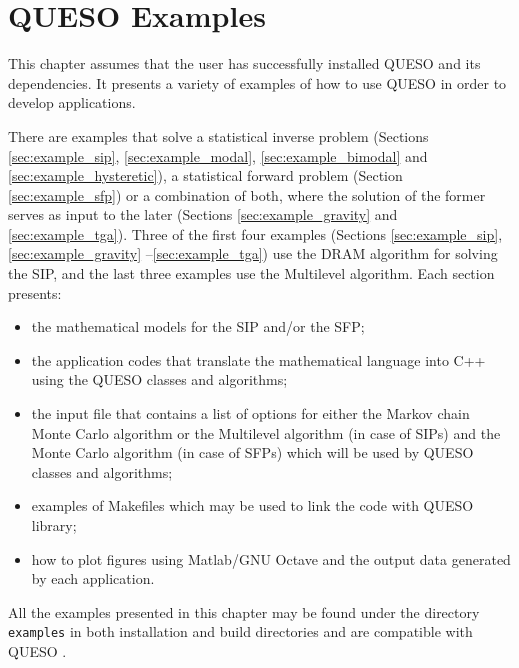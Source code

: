 
\chapter{QUESO Examples}\label{chap:Queso-examples}

This chapter assumes that the user has successfully installed QUESO and its dependencies.
%
It presents a variety of  examples of how to use QUESO in order to develop applications.

There are examples that solve a statistical inverse problem (Sections \ref{sec:example_sip}, \ref{sec:example_modal}, \ref{sec:example_bimodal} and \ref{sec:example_hysteretic}), a statistical forward problem (Section \ref{sec:example_sfp}) or a combination of both, where the solution of the former serves as input to the later (Sections \ref{sec:example_gravity} and \ref{sec:example_tga}). Three of the first four examples (Sections \ref{sec:example_sip}, \ref{sec:example_gravity} --\ref{sec:example_tga}) use the DRAM algorithm for solving the SIP, and the last three examples use the Multilevel algorithm. 
Each section presents: 
\begin{itemize}
 \item the mathematical models for the SIP and/or the SFP; \vspace*{-6pt}
 \item the application codes  that translate the mathematical language into C++ using the QUESO classes and algorithms;\vspace*{-6pt}
 \item  the input file that contains a list of options for either the Markov chain Monte Carlo algorithm or the Multilevel algorithm (in case of SIPs) and the Monte Carlo algorithm (in case of SFPs) which will be used by QUESO classes and algorithms;\vspace*{-6pt}
 \item examples of Makefiles which may be used to link the code  with QUESO library;\vspace*{-6pt}
 \item how to plot figures using Matlab/GNU Octave  and the output data generated by each application. 
\end{itemize}


All the examples presented in this chapter may be found under the directory \texttt{examples} in both \Queso{} installation and build directories and are compatible with QUESO \QUESOversion{}. 


